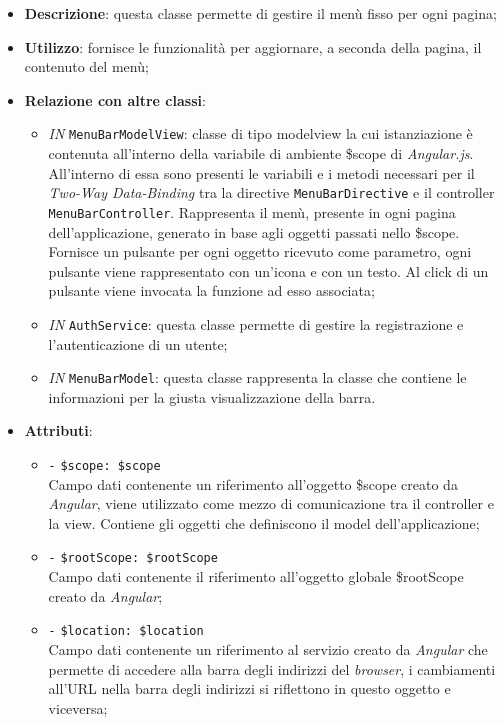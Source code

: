 \begin{itemize}
	\item \textbf{Descrizione}: questa classe permette di gestire il menù fisso per ogni pagina;
	\item \textbf{Utilizzo}: fornisce le funzionalità per aggiornare, a seconda della pagina, il contenuto del menù;
	\item \textbf{Relazione con altre classi}:
	\begin{itemize}
		\item \textit{IN} \texttt{MenuBarModelView}: classe di tipo modelview la cui istanziazione è contenuta all'interno della variabile di ambiente \$scope di \textit{Angular.js}. All'interno di essa sono presenti le variabili e i metodi necessari per il \textit{Two-Way Data-Binding} tra la directive \texttt{MenuBarDirective} e il controller \texttt{MenuBarController}. Rappresenta il menù, presente in ogni pagina dell'applicazione, generato in base agli oggetti passati nello \$scope. Fornisce un pulsante per ogni oggetto ricevuto come parametro, ogni pulsante viene rappresentato con un’icona e con un testo. Al click di un pulsante viene invocata la funzione ad esso associata; 
		\item \textit{IN} \texttt{AuthService}: questa classe permette di gestire la registrazione e l'autenticazione di un utente;
		\item \textit{IN} \texttt{MenuBarModel}: questa classe rappresenta la classe che contiene le informazioni per la giusta visualizzazione della barra.
	\end{itemize}
	\item \textbf{Attributi}:
	\begin{itemize}
		\item \texttt{-} \texttt{\$scope: \$scope} \\
		Campo dati contenente un riferimento all’oggetto \$scope creato da \textit{Angular}, viene utilizzato come mezzo di comunicazione tra il controller e la view. Contiene gli oggetti che definiscono il model dell’applicazione;
		\item \texttt{-} \texttt{\$rootScope: \$rootScope} \\
		Campo dati contenente il riferimento all'oggetto globale \$rootScope creato da \textit{Angular};
		\item \texttt{-} \texttt{\$location: \$location} \\
		Campo dati contenente un riferimento al servizio creato da \textit{Angular} che permette di accedere alla barra degli indirizzi del \textit{browser}, i cambiamenti all’URL nella barra degli indirizzi si riflettono in questo oggetto e viceversa; 

\end{itemize}
\end{itemize}
